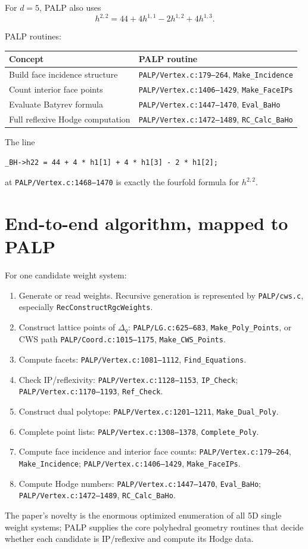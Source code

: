 \documentclass[11pt]{article}
\begin{document}
For \(d=5\), PALP also uses
\[
h^{2,2}=44+4h^{1,1}-2h^{1,2}+4h^{1,3}.
\]

PALP routines:

\begin{center}
\begin{tabular}{@{}ll@{}}
\toprule
Concept & PALP routine \\
\midrule
Build face incidence structure & \texttt{PALP/Vertex.c:179--264}, \texttt{Make\_Incidence} \\
Count interior face points & \texttt{PALP/Vertex.c:1406--1429}, \texttt{Make\_FaceIPs} \\
Evaluate Batyrev formula & \texttt{PALP/Vertex.c:1447--1470}, \texttt{Eval\_BaHo} \\
Full reflexive Hodge computation & \texttt{PALP/Vertex.c:1472--1489}, \texttt{RC\_Calc\_BaHo} \\
\bottomrule
\end{tabular}
\end{center}

The line
\begin{verbatim}
_BH->h22 = 44 + 4 * h1[1] + 4 * h1[3] - 2 * h1[2];
\end{verbatim}
at \texttt{PALP/Vertex.c:1468--1470} is exactly the fourfold formula for \(h^{2,2}\).

\section{End-to-end algorithm, mapped to PALP}

For one candidate weight system:
\begin{enumerate}
  \item Generate or read weights. Recursive generation is represented by \texttt{PALP/cws.c}, especially \texttt{RecConstructRgcWeights}.
  \item Construct lattice points of \(\Delta_q\): \texttt{PALP/LG.c:625--683}, \texttt{Make\_Poly\_Points}, or CWS path \texttt{PALP/Coord.c:1015--1175}, \texttt{Make\_CWS\_Points}.
  \item Compute facets: \texttt{PALP/Vertex.c:1081--1112}, \texttt{Find\_Equations}.
  \item Check IP/reflexivity: \texttt{PALP/Vertex.c:1128--1153}, \texttt{IP\_Check}; \texttt{PALP/Vertex.c:1170--1193}, \texttt{Ref\_Check}.
  \item Construct dual polytope: \texttt{PALP/Vertex.c:1201--1211}, \texttt{Make\_Dual\_Poly}.
  \item Complete point lists: \texttt{PALP/Vertex.c:1308--1378}, \texttt{Complete\_Poly}.
  \item Compute face incidence and interior face counts: \texttt{PALP/Vertex.c:179--264}, \texttt{Make\_Incidence}; \texttt{PALP/Vertex.c:1406--1429}, \texttt{Make\_FaceIPs}.
  \item Compute Hodge numbers: \texttt{PALP/Vertex.c:1447--1470}, \texttt{Eval\_BaHo}; \texttt{PALP/Vertex.c:1472--1489}, \texttt{RC\_Calc\_BaHo}.
\end{enumerate}

The paper's novelty is the enormous optimized enumeration of all 5D single weight systems; PALP supplies the core polyhedral geometry routines that decide whether each candidate is IP/reflexive and compute its Hodge data.
\end{document}
